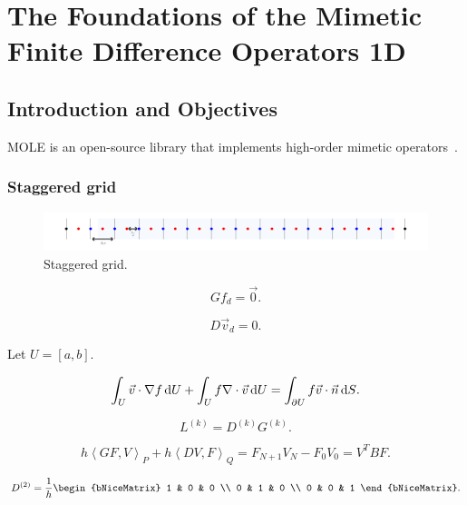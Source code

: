 \part{The Foundations of the Mimetic Finite Difference Operators 1D}

\chapter{Introduction and Objectives}

MOLE is an open-source library that implements high-order mimetic
operators~\cite{Corbino2024}.

\section{Staggered grid}

\begin{figure}[ht!]
	\centering
	\includegraphics[width=0.8\paperwidth]{staggered}
	\caption{Staggered grid.}
\end{figure}

\begin{equation*}
	Gf_{d}=\vec{0}.
\end{equation*}

\begin{equation*}
	D\vec{v}_{d}=0.
\end{equation*}

Let $U=\left[a,b\right]$.

\begin{equation*}
	\int_{U}
	\vec{v}\cdot\nabla f\dl U+
	\int_{U}
	f\nabla\cdot\vec{v}\dl U=
	\int_{\partial U}
	f\vec{v}\cdot\vec{n}\dl S.
\end{equation*}

\begin{equation*}
	L^{\left(k\right)}=
	D^{\left(k\right)}
	G^{\left(k\right)}.
\end{equation*}

\begin{equation*}
	h
	{\left\langle GF,V\right\rangle}_{P}+
	h
		{\left\langle DV,F\right\rangle}_{Q}=
	F_{N+1}V_{N}-F_{0}V_{0}=
	V^{T}BF.
\end{equation*}

\begin{equation*}
	D^{\left(2\right)}=
	\frac{1}{h}
	\begin{bNiceMatrix}
		1 & 0 & 0 \\
		0 & 1 & 0 \\
		0 & 0 & 1
	\end{bNiceMatrix}.
\end{equation*}

